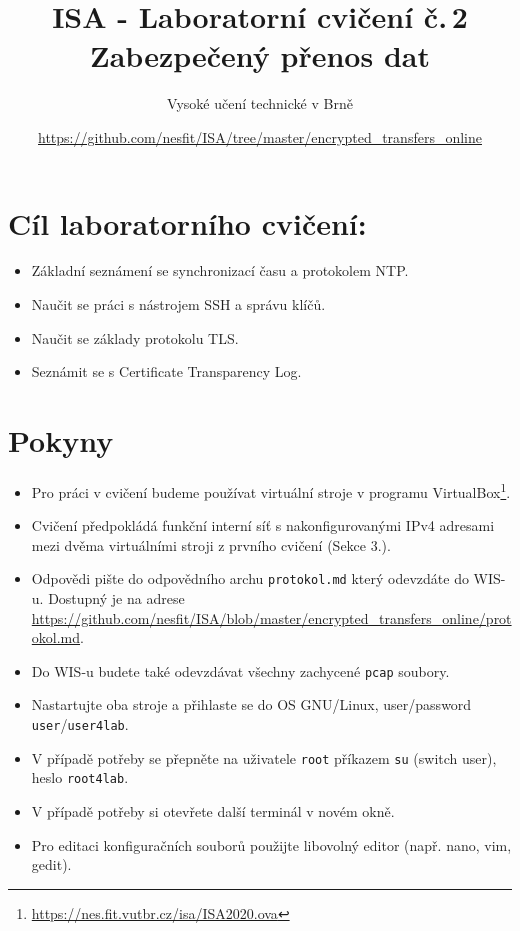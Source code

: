 \documentclass[a4paper,11pt]{article}
\title{ISA - Laboratorní cvičení č.\,2\\
{\bf\large Zabezpečený přenos dat}}
\author{Vysoké učení technické v Brně}
\date{\url{https://github.com/nesfit/ISA/tree/master/encrypted_transfers_online}}
\begin{document}
{\let\newpage\relax\maketitle}

\section*{Cíl laboratorního cvičení:}
\begin{itemize}
  \item Základní seznámení se synchronizací času a protokolem NTP.
  \item Naučit se práci s nástrojem SSH a správu klíčů.
  \item Naučit se základy protokolu TLS.
  \item Seznámit se s Certificate Transparency Log.
\end{itemize}

\section*{Pokyny}
\begin{itemize}

  \item Pro práci v cvičení budeme používat virtuální stroje v programu VirtualBox\footnote{\url{https://nes.fit.vutbr.cz/isa/ISA2020.ova}}.

  \item Cvičení předpokládá funkční interní síť s nakonfigurovanými IPv4 adresami mezi dvěma virtuálními stroji z prvního cvičení (Sekce 3.).

  \item Odpovědi pište do odpovědního archu \texttt{protokol.md} který odevzdáte do WIS-u.
    Dostupný je na adrese \url{https://github.com/nesfit/ISA/blob/master/encrypted_transfers_online/protokol.md}.

  \item Do WIS-u budete také odevzdávat všechny zachycené \texttt{pcap} soubory.

  \item Nastartujte oba stroje a přihlaste se do OS GNU/Linux, user/password {\tt user}/{\tt user4lab}.

  \item V případě potřeby se přepněte na uživatele {\tt root} příkazem {\tt su} (switch user), heslo {\tt root4lab}.

  \item V případě potřeby si otevřete další terminál v novém okně.

  \item Pro editaci konfiguračních souborů použijte libovolný editor (např. nano, vim, gedit).

\end{itemize}
\end{document}
